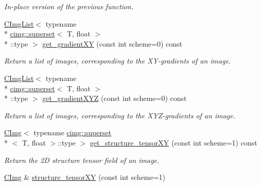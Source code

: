 \begin{DoxyCompactItemize}
\begin{DoxyCompactList}\small\item\em In-\/place version of the previous function. \end{DoxyCompactList}\item 
\hyperlink{structcimg__library_1_1_c_img_list}{C\-Img\-List}$<$ typename \\*
\hyperlink{structcimg__library_1_1cimg_1_1superset}{cimg\-::superset}$<$ T, float $>$\\*
\-::type $>$ \hyperlink{structcimg__library_1_1_c_img_a53660ab8bc322716aafa5abe1d45072d}{get\-\_\-gradient\-X\-Y} (const int scheme=0) const 
\begin{DoxyCompactList}\small\item\em Return a list of images, corresponding to the X\-Y-\/gradients of an image. \end{DoxyCompactList}\item 
\hyperlink{structcimg__library_1_1_c_img_list}{C\-Img\-List}$<$ typename \\*
\hyperlink{structcimg__library_1_1cimg_1_1superset}{cimg\-::superset}$<$ T, float $>$\\*
\-::type $>$ \hyperlink{structcimg__library_1_1_c_img_a36b8fa873f7331293c1eea8e610cd37e}{get\-\_\-gradient\-X\-Y\-Z} (const int scheme=0) const 
\begin{DoxyCompactList}\small\item\em Return a list of images, corresponding to the X\-Y\-Z-\/gradients of an image. \end{DoxyCompactList}\item 
\hypertarget{structcimg__library_1_1_c_img_a345ad919460db30afc35467cf18cdc47}{\hyperlink{structcimg__library_1_1_c_img}{C\-Img}$<$ typename \hyperlink{structcimg__library_1_1cimg_1_1superset}{cimg\-::superset}\\*
$<$ T, float $>$\-::type $>$ \hyperlink{structcimg__library_1_1_c_img_a345ad919460db30afc35467cf18cdc47}{get\-\_\-structure\-\_\-tensor\-X\-Y} (const int scheme=1) const }\label{structcimg__library_1_1_c_img_a345ad919460db30afc35467cf18cdc47}

\begin{DoxyCompactList}\small\item\em Return the 2\-D structure tensor field of an image. \end{DoxyCompactList}\item 
\hypertarget{structcimg__library_1_1_c_img_a95bf97089ffefc83f1d36c2279fd0ff8}{\hyperlink{structcimg__library_1_1_c_img}{C\-Img} \& \hyperlink{structcimg__library_1_1_c_img_a95bf97089ffefc83f1d36c2279fd0ff8}{structure\-\_\-tensor\-X\-Y} (const int scheme=1)}\label{structcimg__library_1_1_c_img_a95bf97089ffefc83f1d36c2279fd0ff8}


\end{DoxyCompactItemize}
